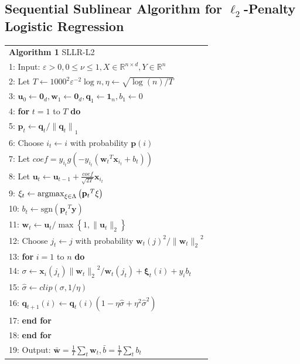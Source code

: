 \documentclass{llncs}
\newcommand{\bw}{\mathbf{w}}
\newcommand{\bu}{\mathbf{u}}
\newcommand{\bp}{\mathbf{p}}
\newcommand{\bq}{\mathbf{q}}
\newcommand{\bxi}{\mathbf{\xi}}
\newcommand{\lc}{\left(}
\newcommand{\rc}{\right)}
\newcommand{\li}{\lc i\rc}
\newcommand{\lj}{\lc j\rc}
\newcommand{\tspace}{\hspace*{2em}}
\def\argmax{\mathop{\rm argmax}}
\def\sgn{\mathrm{sgn}}
\begin{document}
\subsection{Sequential Sublinear Algorithm for $\ell_2$-Penalty Logistic Regression} \label{sec:l2alg}
	
	\begin{table} [ht]
	\begin{tabular}{l}
	\hline\noalign{\smallskip}
	\textbf{Algorithm 1} SLLR-L2 \\
	\noalign{\smallskip}
	\hline
	\noalign{\smallskip}
		1:    Input: $\varepsilon>0, 0\leq\nu\leq1, X\in\mathbb{R}^{n\times d}, Y\in\mathbb{R}^{n} $ \\
		2:    Let $T\leftarrow{1000}^{2}{\varepsilon}^{-2}\log n, \eta\leftarrow\sqrt{\log\lc n\rc/T}$ \\
		3:    \tspace ${\mathbf{u}}_{0}\leftarrow{\mathbf{0}}_{d},{\bw}_{1}\leftarrow{\mathbf{0}}_{d},{\mathbf{\bq}}_{1}\leftarrow{\mathbf{1}}_{n},{b}_{1}\leftarrow 0$\\
		4:    \textbf{for} $t=1$ to $T$ \textbf{do} \\
		5:    \tspace ${\bp}_{t}\leftarrow{\bq}_{t}/{\|{\bq}_{t}\|}_{1}$ \\
		6:    \tspace Choose ${i}_{t}\leftarrow i$ with probability $\bp(i)$ \\
		7:    \tspace Let $coef={y}_{{i}_{t}}g\lc-{y}_{{i}_{t}}\lc {{\bw}_{t}}^{T}{\mathbf{x}}_{i_t}+{b}_{t} \rc\rc$ \\
		8:    \tspace Let ${\bu}_{t}\leftarrow {\bu}_{t-1}+\frac{coef}{\sqrt{2T}}{\mathbf{x}}_{{i}_{t}}$ \\
		9:    \tspace\tspace ${\bxi}_{t}\leftarrow \argmax_{\bxi\in \Lambda}\lc{{\bp}_{t}}^{T}\bxi\rc$ \\
		10:   \tspace\hspace*{1.2em} ${b}_{t}\leftarrow \sgn\lc {{\bp}_{t}}^{T}\mathbf{y}\rc$ \\
		11:   \tspace ${\bw}_{t}\leftarrow {\bu}_{t}/\max \left\{1,\|{\bu}_{t}\|_2 \right\}$ \\
		12:   \tspace Choose ${j}_{t}\leftarrow j$ with probability ${{\bw}_{t}\lj}^{2}/{\|{\bw}_{t}\|_2}^{2} $ \\
		13:   \tspace \textbf{for} $i=1$ to $n$ \textbf{do} \\
		14:   \tspace\tspace $\sigma \leftarrow \mathbf{x}_{i} \lc {j}_{t}\rc{\|{\bw}_{t}\|_2}^{2}/{\bw}_{t}\lc {j}_{t} \rc+{\bxi}_{t}\li+{y}_{i}{b}_{t}$ \\
		15:   \tspace\tspace $\hat{\sigma} \leftarrow clip\lc \sigma,1/\eta \rc$ \\
		16:   \tspace\tspace ${\bq}_{t+1}\li \leftarrow {\bq}_{t}\li\lc 1-\eta\hat{\sigma} + {\eta}^{2}{\hat{\sigma}}^{2} \rc$ \\
		17:   \tspace \textbf{end for} \\
		18:   \textbf{end for} \\
		19:   Output: $\bar{\bw}=\frac{1}{T}\sum_{t}{\bw}_{t},\bar{b}=\frac{1}{T}\sum_{t}{b}_{t}$ \\
	\hline
	\end{tabular} 	
	\label{alg:1}
	\end{table}
\end{document}
